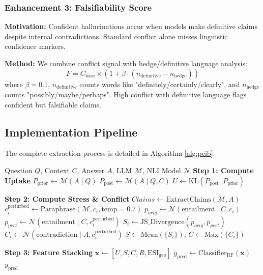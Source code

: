 \documentclass[11pt,letterpaper]{article}
\newcommand{\modelname}{\textsc{Pcib}}
\begin{document}
\subsubsection{Enhancement 3: Falsifiability Score}
\textbf{Motivation:} Confident hallucinations occur when models make definitive claims despite internal contradictions. Standard conflict alone misses linguistic confidence markers.

\textbf{Method:} We combine conflict signal with hedge/definitive language analysis:
\begin{equation}
    F = C_{\text{base}} \times \left(1 + \beta \cdot (n_{\text{definitive}} - n_{\text{hedge}})\right)
\end{equation}
where $\beta=0.1$, $n_{\text{definitive}}$ counts words like "definitely/certainly/clearly", and $n_{\text{hedge}}$ counts "possibly/maybe/perhaps". High conflict with definitive language flags confident but falsifiable claims.

\subsection{Implementation Pipeline}

The complete extraction process is detailed in Algorithm \ref{alg:pcib}.

\begin{algorithm}[H]
\caption{\modelname\ Signal Extraction Pipeline}
\label{alg:pcib}
\begin{algorithmic}[1]
\REQUIRE Question $Q$, Context $C$, Answer $A$, LLM $\mathcal{M}$, NLI Model $\mathcal{N}$
\STATE \textbf{Step 1: Compute Uptake}
\STATE $P_{\text{prior}} \leftarrow \mathcal{M}(A \mid Q)$
\STATE $P_{\text{post}} \leftarrow \mathcal{M}(A \mid Q, C)$
\STATE $U \leftarrow \text{KL}(P_{\text{post}} || P_{\text{prior}})$

\STATE \textbf{Step 2: Compute Stress \& Conflict}
\STATE $Claims \leftarrow \text{ExtractClaims}(\mathcal{M}, A)$
    \STATE $c_i^{\text{perturbed}} \leftarrow \text{Paraphrase}(\mathcal{M}, c_i, \text{temp}=0.7)$
    \STATE $p_{orig} \leftarrow \mathcal{N}(\text{entailment} \mid C, c_i)$
    \STATE $p_{pert} \leftarrow \mathcal{N}(\text{entailment} \mid C, c_i^{\text{perturbed}})$
    \STATE $S_i \leftarrow \text{JS\_Divergence}(p_{orig}, p_{pert})$
    \STATE $C_i \leftarrow \mathcal{N}(\text{contradiction} \mid A, c_i^{\text{perturbed}})$
\ENDFOR
\STATE $S \leftarrow \text{Mean}(\{S_i\})$, $C \leftarrow \text{Max}(\{C_i\})$

\STATE \textbf{Step 3: Feature Stacking}
\STATE $\mathbf{x} \leftarrow [U, S, C, R, \text{ESI}_{\text{geo}}]$
\STATE $y_{\text{pred}} \leftarrow \text{Classifier}_{\text{RF}}(\mathbf{x})$
\RETURN $y_{\text{pred}}$
\end{algorithmic}
\end{algorithm}
\end{document}
